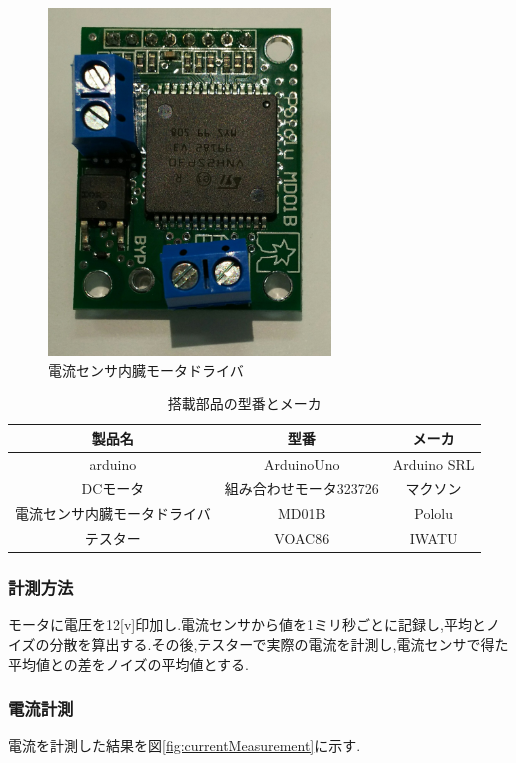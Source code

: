 \begin{figure}[htbp]
 \begin{center}
    \includegraphics[width=75mm]{img/currentDriver.JPG}
    \end{center}
  \caption{電流センサ内臓モータドライバ}
 \label{fig:currentDriver}
\end{figure}

\begin{table}[htb]
 \begin{center}
  \caption{搭載部品の型番とメーカ}
  \begin{tabular}[htbp]{|c|c|c|}
   \hline
   製品名&型番&メーカ \\
   \hline
   arduino&ArduinoUno&Arduino SRL\\
   \hline
   DCモータ&組み合わせモータ323726&マクソン\\
   \hline
   電流センサ内臓モータドライバ&MD01B&Pololu\\
   \hline
   テスター&VOAC86&IWATU\\
   \hline
  \end{tabular}
  \label{tab:partsCurrent}
 \end{center}
\end{table}

\subsubsection{計測方法}
モータに電圧を12[v]印加し.電流センサから値を1ミリ秒ごとに記録し,平均とノイズの分散を算出する.その後,テスターで実際の電流を計測し,電流センサで得た平均値との差をノイズの平均値とする.

\subsubsection{電流計測}
電流を計測した結果を図\ref{fig:currentMeasurement}に示す.

